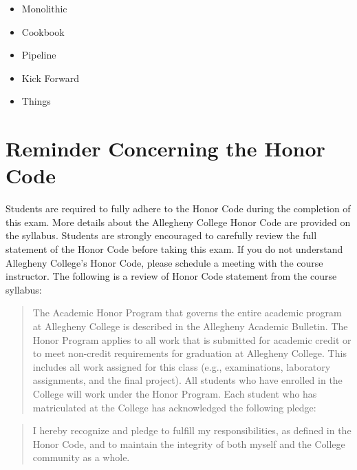\documentclass[11pt]{article}
\begin{document}
\begin{itemize}
\begin{itemize}
        \begin{itemize}
          \itemsep 0.025in
          \item Monolithic
          \item Cookbook
          \item Pipeline
          \item Kick Forward
          \item Things
        \end{itemize}

    \end{itemize}

\end{itemize}

\section*{Reminder Concerning the Honor Code}

\noindent Students are required to fully adhere to the Honor Code during the
completion of this exam. More details about the Allegheny College Honor Code are
provided on the syllabus. Students are strongly encouraged to carefully review
the full statement of the Honor Code before taking this exam. If you do not
understand Allegheny College's Honor Code, please schedule a meeting with the
course instructor. The following is a review of Honor Code statement from the
course syllabus:

\begin{quote}

  The Academic Honor Program that governs the entire academic program at
  Allegheny College is described in the Allegheny Academic Bulletin. The Honor
  Program applies to all work that is submitted for academic credit or to meet
  non-credit requirements for graduation at Allegheny College. This includes all
  work assigned for this class (e.g., examinations, laboratory assignments, and
  the final project). All students who have enrolled in the College will work
  under the Honor Program. Each student who has matriculated at the College has
  acknowledged the following pledge:

\end{quote}

\begin{quote}

  I hereby recognize and pledge to fulfill my responsibilities, as defined in
  the Honor Code, and to maintain the integrity of both myself and the College
  community as a whole.

\end{quote}
\end{document}
